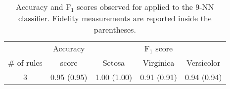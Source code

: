 
\begin{table}
	\caption{Accuracy and F$_1$ scores observed for \cart{} applied to the 9-NN classifier. Fidelity measurements are reported inside the parentheses.}
	\begin{tabular}{c|c|ccc}
		\toprule
		& Accuracy & \multicolumn{3}{c}{F$_1$ score}\\
 		\# of rules & score & Setosa & Virginica & Versicolor \\
		\midrule
		3 & 0.95 (0.95) & 1.00 (1.00) & 0.91 (0.91) & 0.94 (0.94) \\
		\bottomrule
	\end{tabular}
\end{table}
